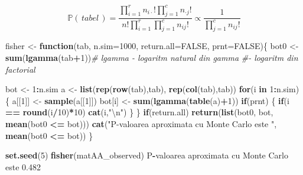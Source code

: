 \documentclass[]{article}
\newenvironment{Shaded}{\begin{snugshade}}{\end{snugshade}}
\newcommand{\KeywordTok}[1]{\textcolor[rgb]{0.13,0.29,0.53}{\textbf{#1}}}
\newcommand{\DataTypeTok}[1]{\textcolor[rgb]{0.13,0.29,0.53}{#1}}
\newcommand{\DecValTok}[1]{\textcolor[rgb]{0.00,0.00,0.81}{#1}}
\newcommand{\FloatTok}[1]{\textcolor[rgb]{0.00,0.00,0.81}{#1}}
\newcommand{\CharTok}[1]{\textcolor[rgb]{0.31,0.60,0.02}{#1}}
\newcommand{\StringTok}[1]{\textcolor[rgb]{0.31,0.60,0.02}{#1}}
\newcommand{\CommentTok}[1]{\textcolor[rgb]{0.56,0.35,0.01}{\textit{#1}}}
\newcommand{\OtherTok}[1]{\textcolor[rgb]{0.56,0.35,0.01}{#1}}
\newcommand{\ControlFlowTok}[1]{\textcolor[rgb]{0.13,0.29,0.53}{\textbf{#1}}}
\newcommand{\OperatorTok}[1]{\textcolor[rgb]{0.81,0.36,0.00}{\textbf{#1}}}
\newcommand{\NormalTok}[1]{#1}
\begin{document}
\[
  \mathbb{P}(\,tabel\,) = \frac{\prod_{i=1}^{r}n_{i\cdot}!\prod_{j=1}^{c}n_{\cdot j}!}{n!\prod_{i=1}^{r}\prod_{j=1}^{c}n_{ij}!}\propto\frac{1}{\prod_{j=1}^{c}n_{ij}!}
\]

\begin{Shaded}
\begin{Highlighting}[]
\NormalTok{fisher <-}\StringTok{ }\ControlFlowTok{function}\NormalTok{(tab, }\DataTypeTok{n.sim=}\DecValTok{1000}\NormalTok{, }\DataTypeTok{return.all=}\OtherTok{FALSE}\NormalTok{, }\DataTypeTok{prnt=}\OtherTok{FALSE}\NormalTok{)\{}
\NormalTok{  bot0 <-}\StringTok{ }\KeywordTok{sum}\NormalTok{(}\KeywordTok{lgamma}\NormalTok{(tab}\OperatorTok{+}\DecValTok{1}\NormalTok{))}\CommentTok{# lgamma - logaritm natural din gamma }
                            \CommentTok{#- logaritm din factorial}

\NormalTok{  bot <-}\StringTok{ }\DecValTok{1}\OperatorTok{:}\NormalTok{n.sim}
\NormalTok{  a <-}\StringTok{ }\KeywordTok{list}\NormalTok{(}\KeywordTok{rep}\NormalTok{(}\KeywordTok{row}\NormalTok{(tab),tab), }\KeywordTok{rep}\NormalTok{(}\KeywordTok{col}\NormalTok{(tab),tab))}
  \ControlFlowTok{for}\NormalTok{(i }\ControlFlowTok{in} \DecValTok{1}\OperatorTok{:}\NormalTok{n.sim) \{}
\NormalTok{    a[[}\DecValTok{1}\NormalTok{]] <-}\StringTok{ }\KeywordTok{sample}\NormalTok{(a[[}\DecValTok{1}\NormalTok{]])}
\NormalTok{    bot[i] <-}\StringTok{ }\KeywordTok{sum}\NormalTok{(}\KeywordTok{lgamma}\NormalTok{(}\KeywordTok{table}\NormalTok{(a)}\OperatorTok{+}\DecValTok{1}\NormalTok{))}
    \ControlFlowTok{if}\NormalTok{(prnt) \{ }\ControlFlowTok{if}\NormalTok{(i }\OperatorTok{==}\StringTok{ }\KeywordTok{round}\NormalTok{(i}\OperatorTok{/}\DecValTok{10}\NormalTok{)}\OperatorTok{*}\DecValTok{10}\NormalTok{) }\KeywordTok{cat}\NormalTok{(i,}\StringTok{"}\CharTok{\textbackslash{}n}\StringTok{"}\NormalTok{) \}}
\NormalTok{  \}}
  \ControlFlowTok{if}\NormalTok{(return.all) }\KeywordTok{return}\NormalTok{(}\KeywordTok{list}\NormalTok{(bot0, bot, }\KeywordTok{mean}\NormalTok{(bot0 }\OperatorTok{<=}\StringTok{ }\NormalTok{bot)))}
  \KeywordTok{cat}\NormalTok{(}\StringTok{"P-valoarea aproximata cu Monte Carlo este "}\NormalTok{, }\KeywordTok{mean}\NormalTok{(bot0 }\OperatorTok{<=}\StringTok{ }\NormalTok{bot))}
\NormalTok{\}}

\KeywordTok{set.seed}\NormalTok{(}\DecValTok{5}\NormalTok{)}
\KeywordTok{fisher}\NormalTok{(matAA_observed)}
\NormalTok{P}\OperatorTok{-}\NormalTok{valoarea aproximata cu Monte Carlo este  }\FloatTok{0.482}
\end{Highlighting}
\end{Shaded}
\end{document}
